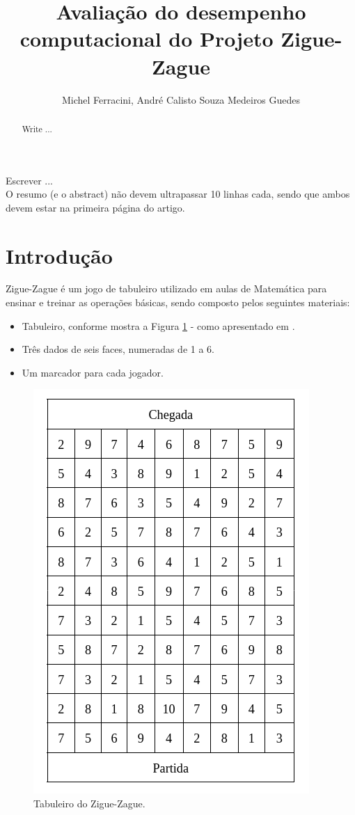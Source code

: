 \documentclass[12pt]{article}
\title{Avaliação do desempenho computacional do Projeto Zigue-Zague}
\author{Michel Ferracini\inst{1}, André Calisto Souza Medeiros Guedes\inst{1}}
\begin{document}
 

\maketitle

\begin{abstract}
  Write ...
\end{abstract}
     
\begin{resumo} 
  Escrever ...\\
  O resumo (e o abstract) não devem ultrapassar 10 linhas cada, sendo que ambos devem estar na primeira
  página do artigo.
\end{resumo}

\section{Introdução}

Zigue-Zague é um jogo de tabuleiro utilizado em aulas de Matemática para ensinar e treinar as operações básicas, sendo composto pelos seguintes materiais:

\begin{itemize}
	\item Tabuleiro, conforme mostra a Figura \ref{tabuleiro-zigue-zague} - como apresentado em \cite{silvakodama:2007}.
	\item Três dados de seis faces, numeradas de 1 a 6.
	\item Um marcador para cada jogador.
\end{itemize}

\begin{figure}[ht!]
	\centering
	\includegraphics[width=0.4\linewidth]{img/tabuleiro}
	\caption{Tabuleiro do Zigue-Zague.}
	\label{tabuleiro-zigue-zague}
\end{figure}
\end{document}
